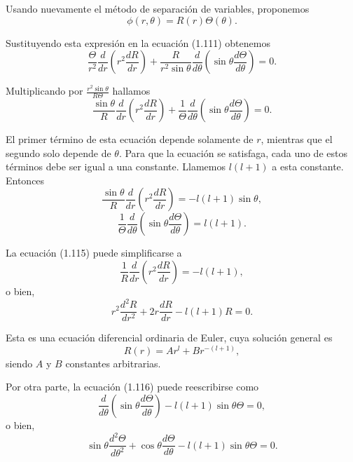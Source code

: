 \documentclass[12pt,a4paper]{book}
\begin{document}
Usando nuevamente el método de separación de variables, proponemos
\begin{equation}
\phi(r, \theta) = R(r)\Theta(\theta).
\end{equation}

Sustituyendo esta expresión en la ecuación (1.111) obtenemos
\begin{equation}
\frac{\Theta}{r^2}\frac{d}{dr}\left(r^2\frac{dR}{dr}\right) + \frac{R}{r^2\sin\theta}\frac{d}{d\theta}\left(\sin\theta\frac{d\Theta}{d\theta}\right) = 0.
\end{equation}

Multiplicando por $\frac{r^2\sin\theta}{R\Theta}$ hallamos
\begin{equation}
\frac{\sin\theta}{R}\frac{d}{dr}\left(r^2\frac{dR}{dr}\right) + \frac{1}{\Theta}\frac{d}{d\theta}\left(\sin\theta\frac{d\Theta}{d\theta}\right) = 0.
\end{equation}

El primer término de esta ecuación depende solamente de $r$, mientras que el segundo solo depende de $\theta$. Para que la ecuación se satisfaga, cada uno de estos términos debe ser igual a una constante. Llamemos $l(l+1)$ a esta constante. Entonces
\begin{equation}
\frac{\sin\theta}{R}\frac{d}{dr}\left(r^2\frac{dR}{dr}\right) = -l(l+1)\sin\theta,
\end{equation}
\begin{equation}
\frac{1}{\Theta}\frac{d}{d\theta}\left(\sin\theta\frac{d\Theta}{d\theta}\right) = l(l+1).
\end{equation}

La ecuación (1.115) puede simplificarse a
\begin{equation}
\frac{1}{R}\frac{d}{dr}\left(r^2\frac{dR}{dr}\right) = -l(l+1),
\end{equation}
o bien,
\begin{equation}
r^2\frac{d^2R}{dr^2} + 2r\frac{dR}{dr} - l(l+1)R = 0.
\end{equation}

Esta es una ecuación diferencial ordinaria de Euler, cuya solución general es
\begin{equation}
R(r) = Ar^l + Br^{-(l+1)},
\end{equation}
siendo $A$ y $B$ constantes arbitrarias.

Por otra parte, la ecuación (1.116) puede reescribirse como
\begin{equation}
\frac{d}{d\theta}\left(\sin\theta\frac{d\Theta}{d\theta}\right) - l(l+1)\sin\theta\Theta = 0,
\end{equation}
o bien,
\begin{equation}
\sin\theta\frac{d^2\Theta}{d\theta^2} + \cos\theta\frac{d\Theta}{d\theta} - l(l+1)\sin\theta\Theta = 0.
\end{equation}
\end{document}
